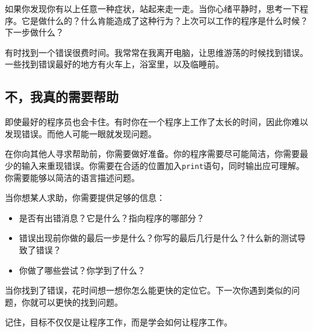 如果你发现你有以上任意一种症状，站起来走一走。当你心绪平静时，思考一下程序。它是做什么的？什么肯能造成了这种行为？上次可以工作的程序是什么时候？下一步做什么？

有时找到一个错误很费时间。我常常在我离开电脑，让思维游荡的时候找到错误。一些找到错误最好的地方有火车上，浴室里，以及临睡前。


\subsection{不，我真的需要帮助}

即使最好的程序员也会卡住。有时你在一个程序上工作了太长的时间，因此你难以发现错误。而他人可能一眼就发现问题。

在你向其他人寻求帮助前，你需要做好准备。你的程序需要尽可能简洁，你需要最少的输入来重现错误。你需要在合适的位置加入{\tt print}语句，同时输出应可理解。你需要能够以简洁的语言描述问题。

当你想某人求助，你需要提供足够的信息：

\begin{itemize}

\item 是否有出错消息？它是什么？指向程序的哪部分？

\item 错误出现前你做的最后一步是什么？你写的最后几行是什么？什么新的测试导致了错误？

\item 你做了哪些尝试？你学到了什么？

\end{itemize}

当你找到了错误，花时间想一想你怎么能更快的定位它。下一次你遇到类似的问题，你就可以更快的找到问题。

记住，目标不仅仅是让程序工作，而是学会如何让程序工作。

\printindex

\clearemptydoublepage

